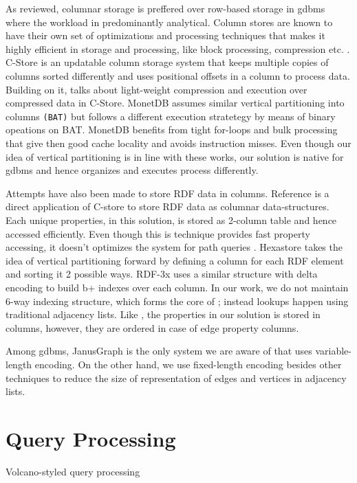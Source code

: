 As reviewed, columnar storage is preffered over row-based storage in \gls{gdbms} where the workload in predominantly analytical. Column stores are known to have their own set of optimizations and processing techniques that makes it highly efficient in storage and processing, like block processing, compression etc. \cite{col-vs-row, design-imp-book}. C-Store \cite{c-store} is an updatable column storage system that keeps multiple copies of columns sorted differently and uses positional offsets in a column to process data. Building on it, \cite{abadi-col-comp, abadi-sparse-col} talks about light-weight compression and execution over compressed data in C-Store. MonetDB \cite{monet-2decades} assumes similar vertical partitioning into columns \texttt{(BAT)} but follows a different execution stratetegy by means of binary opeations on BAT. MonetDB benefits from tight for-loops and bulk processing that give then good cache locality and avoids instruction misses. Even though our idea of vertical partitioning is in line with these works, our solution is native for \gls{gdbms} and hence organizes and executes process differently.

Attempts have also been made to store RDF data in columns. Reference \cite{rdf-vertical} is a direct application of C-store to store RDF data as columnar data-structures. Each unique properties, in this solution, is stored as 2-column table and hence accessed efficiently. Even though this is technique provides fast property accessing, it doesn't optimizes the system for path queries \cite{rdf-vertical-critic}. Hexastore \cite{hexastore} takes the idea of vertical partitioning forward by defining a column for each RDF element and sorting it 2 possible ways. RDF-3x \cite{rdf-3x} uses a similar structure with delta encoding to build b+ indexes over each column. In our work, we do not maintain 6-way indexing structure, which forms the core of \cite{hexastore, rdf-3x}; instead lookups happen using traditional adjacency lists. Like \cite{rdf-vertical}, the properties in our solution is stored in columns, however, they are ordered in case of edge property columns. 

Among \gls{gdbms}, JanusGraph is the only system we are aware of that uses variable-length encoding. On the other hand, we use fixed-length encoding besides other techniques to reduce the size of representation of edges and vertices in adjacency lists.

\section{Query Processing}

Volcano-styled query processing \cite{volcano} 






